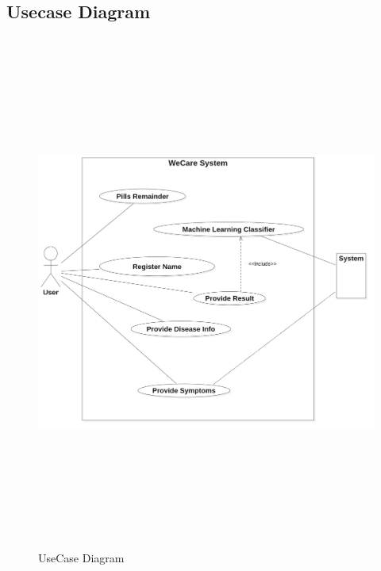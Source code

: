 \subsection{Usecase Diagram}
\begin{figure}[H]
\begin{center}
    
\includegraphics[width=150mm,height=170mm]{images/usecase.png}
 \caption{UseCase Diagram}
 \end{center}                
\end{figure}

